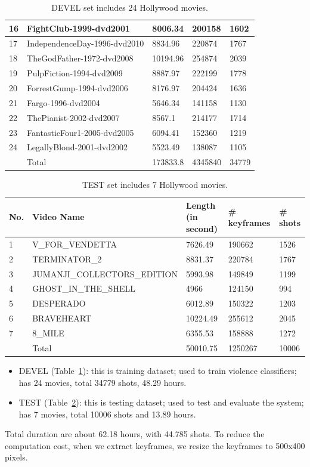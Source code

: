 \documentclass[review]{elsarticle}
\begin{document}
\begin{table}[!t]
\begin{tabular}{ |p{} | p{} | p{} | p{} | p{} | }
	16 & FightClub-1999-dvd2001 & 8006.34 & 200158 & 1602 \\ \hline
	17 & IndependenceDay-1996-dvd2010 & 8834.96 & 220874 & 1767 \\ \hline
	18 & TheGodFather-1972-dvd2008 & 10194.96 & 254874 & 2039 \\ \hline
	19 & PulpFiction-1994-dvd2009 & 8887.97 & 222199 & 1778 \\ \hline
	20 & ForrestGump-1994-dvd2006 & 8176.97 & 204424 & 1636 \\ \hline
	21 & Fargo-1996-dvd2004 & 5646.34 & 141158 & 1130 \\ \hline
	22 & ThePianist-2002-dvd2007 & 8567.1 & 214177 & 1714 \\ \hline
	23 & FantasticFour1-2005-dvd2005 & 6094.41 & 152360 & 1219 \\ \hline
	24 & LegallyBlond-2001-dvd2002 & 5523.49 & 138087 & 1105 \\ \hline
	   & Total & 173833.8 & 4345840 & 34779 \\ \hline
\end{tabular}
\caption{DEVEL set includes 24 Hollywood movies.}
\label{devel-dataset}
\end{table}
\begin{table}[!t]
\begin{tabular}{ |p{} | p{} | p{} | p{} | p{} | }
	\hline
	No. & Video Name & Length (in second) & \# keyframes & \# shots \\ \hline
	1 & V\_FOR\_VENDETTA & 7626.49 & 190662 & 1526 \\ \hline
	2 & TERMINATOR\_2 & 8831.37 & 220784 & 1767 \\ \hline
	3 & JUMANJI\_COLLECTORS\_EDITION & 5993.98 & 149849 & 1199 \\ \hline
	4 & GHOST\_IN\_THE\_SHELL & 4966 & 124150 & 994 \\ \hline
	5 & DESPERADO & 6012.89 & 150322 & 1203 \\ \hline
	6 & BRAVEHEART & 10224.49 & 255612 & 2045 \\ \hline
	7 & 8\_MILE & 6355.53 & 158888 & 1272 \\ \hline
	  & Total & 50010.75 & 1250267 & 10006 \\ \hline
\end{tabular}
\caption{TEST set includes 7 Hollywood movies.}
\label{test-dataset}
\end{table}

\begin{itemize}
	\item DEVEL (Table~\ref{devel-dataset}): this is training dataset; used to train violence classifiers; has 24 movies, total 34779 shots, 48.29 hours. 
	\item TEST (Table~\ref{test-dataset}): this is testing dataset; used to test and evaluate the system; has 7 movies, total 10006 shots and 13.89 hours.
\end{itemize}
Total duration are about 62.18 hours, with 44.785 shots. To reduce the computation cost, when we extract keyframes, we resize the keyframes to 500x400 pixels.
\end{document}
